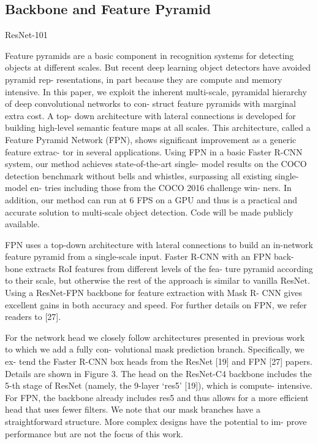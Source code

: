 \subsection{Backbone and Feature Pyramid}\label{bonefpn}

ResNet-101

Feature pyramids are a basic component in recognition systems for detecting objects at different scales. But recent deep learning object detectors have avoided pyramid rep- resentations, in part because they are compute and memory intensive. In this paper, we exploit the inherent multi-scale, pyramidal hierarchy of deep convolutional networks to con- struct feature pyramids with marginal extra cost. A top- down architecture with lateral connections is developed for building high-level semantic feature maps at all scales. This architecture, called a Feature Pyramid Network (FPN), shows significant improvement as a generic feature extrac- tor in several applications. Using FPN in a basic Faster R-CNN system, our method achieves state-of-the-art single- model results on the COCO detection benchmark without bells and whistles, surpassing all existing single-model en- tries including those from the COCO 2016 challenge win- ners. In addition, our method can run at 6 FPS on a GPU and thus is a practical and accurate solution to multi-scale object detection. Code will be made publicly available.


FPN uses a top-down architecture with lateral connections to build an in-network feature pyramid from a single-scale input. Faster R-CNN with an FPN back- bone extracts RoI features from different levels of the fea- ture pyramid according to their scale, but otherwise the rest of the approach is similar to vanilla ResNet. Using a ResNet-FPN backbone for feature extraction with Mask R- CNN gives excellent gains in both accuracy and speed. For further details on FPN, we refer readers to [27].

For the network head we closely follow architectures presented in previous work to which we add a fully con- volutional mask prediction branch. Specifically, we ex- tend the Faster R-CNN box heads from the ResNet [19] and FPN [27] papers. Details are shown in Figure 3. The head on the ResNet-C4 backbone includes the 5-th stage of ResNet (namely, the 9-layer ‘res5’ [19]), which is compute- intensive. For FPN, the backbone already includes res5 and thus allows for a more efficient head that uses fewer filters.
We note that our mask branches have a straightforward structure. More complex designs have the potential to im- prove performance but are not the focus of this work.



